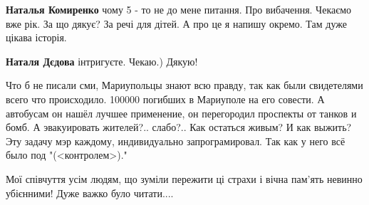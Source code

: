 \begin{itemize} %
\textbf{Наталья Комиренко} чому 5 - то не до мене питання.
Про вибачення. Чекаємо вже рік.
За що дякує? За речі для дітей. А про це я напишу окремо. Там дуже цікава історія.

\textbf{Наталя Дєдова} інтригуєте. Чекаю.) Дякую!

\end{itemize} %


Что б не писали сми, Мариупольцы знают всю правду, так как были свидетелями всего
что происходило. 100000 погибших в Мариуполе на его совести. А автобусам он нашёл
лучшее применение, он перегородил проспекты от танков и бомб. А эвакуировать
жителей?.. слабо?.. Как остаться живым? И как выжить? Эту задачу мэр каждому,
индивидуально запрограмировал. Так как у него всё было под "(<контролем>)."


Мої співчуття усім людям, що зуміли пережити ці страхи і вічна пам'ять невинно
убієнними! Дуже важко було читати....
